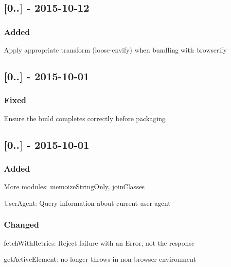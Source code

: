 \subsection*{\mbox{[}0..\mbox{]} -\/ 2015-\/10-\/12}

\subsubsection*{Added}


\begin{DoxyItemize}
\item Apply appropriate transform ({\ttfamily loose-\/envify}) when bundling with {\ttfamily browserify}
\end{DoxyItemize}

\subsection*{\mbox{[}0..\mbox{]} -\/ 2015-\/10-\/01}

\subsubsection*{Fixed}


\begin{DoxyItemize}
\item Ensure the build completes correctly before packaging
\end{DoxyItemize}

\subsection*{\mbox{[}0..\mbox{]} -\/ 2015-\/10-\/01}

\subsubsection*{Added}


\begin{DoxyItemize}
\item More modules\+: {\ttfamily memoize\+String\+Only}, {\ttfamily join\+Classes}
\item {\ttfamily User\+Agent}\+: Query information about current user agent
\end{DoxyItemize}

\subsubsection*{Changed}


\begin{DoxyItemize}
\item {\ttfamily fetch\+With\+Retries}\+: Reject failure with an Error, not the response
\item {\ttfamily get\+Active\+Element}\+: no longer throws in non-\/browser environment 
\end{DoxyItemize}